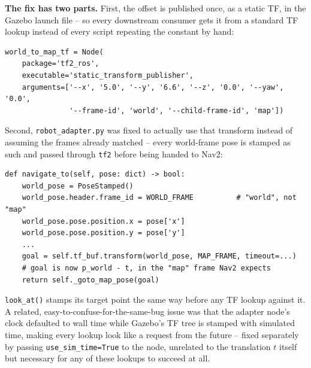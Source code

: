 \documentclass[11pt]{article}
\begin{document}
\textbf{The fix has two parts.} First, the offset is published once, as a static TF,
in the Gazebo launch file -- so every downstream consumer gets it from a standard TF
lookup instead of every script repeating the constant by hand:
\begin{lstlisting}[style=sh, caption={hsrb\_apartment\_world.launch.py -- world$\to$map static transform}]
world_to_map_tf = Node(
    package='tf2_ros',
    executable='static_transform_publisher',
    arguments=['--x', '5.0', '--y', '6.6', '--z', '0.0', '--yaw', '0.0',
               '--frame-id', 'world', '--child-frame-id', 'map'])
\end{lstlisting}

Second, \texttt{robot\_adapter.py} was fixed to actually use that transform instead of
assuming the frames already matched -- every world-frame pose is stamped as such and
passed through \texttt{tf2} before being handed to Nav2:
\begin{lstlisting}[caption={robot\_adapter.py -- navigate\_to(), the world$\to$map lookup}]
def navigate_to(self, pose: dict) -> bool:
    world_pose = PoseStamped()
    world_pose.header.frame_id = WORLD_FRAME          # "world", not "map"
    world_pose.pose.position.x = pose['x']
    world_pose.pose.position.y = pose['y']
    ...
    goal = self.tf_buf.transform(world_pose, MAP_FRAME, timeout=...)
    # goal is now p_world - t, in the "map" frame Nav2 expects
    return self._goto_map_pose(goal)
\end{lstlisting}
\texttt{look\_at()} stamps its target point the same way before any TF lookup against
it. A related, easy-to-confuse-for-the-same-bug issue was that the adapter node's clock
defaulted to wall time while Gazebo's TF tree is stamped with simulated time, making
every lookup look like a request from the future -- fixed separately by passing
\texttt{use\_sim\_time=True} to the node, unrelated to the translation $t$ itself but
necessary for any of these lookups to succeed at all.
\end{document}
